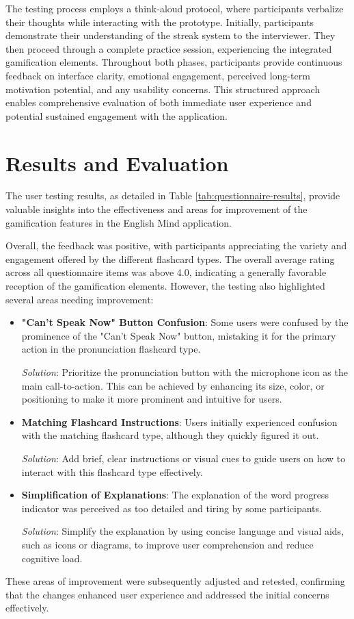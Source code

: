 The testing process employs a think-aloud protocol, where participants verbalize their thoughts while interacting with the prototype. Initially, participants demonstrate their understanding of the streak system to the interviewer. They then proceed through a complete practice session, experiencing the integrated gamification elements. Throughout both phases, participants provide continuous feedback on interface clarity, emotional engagement, perceived long-term motivation potential, and any usability concerns. This structured approach enables comprehensive evaluation of both immediate user experience and potential sustained engagement with the application.

\newpage

\section{Results and Evaluation}

The user testing results, as detailed in Table \ref{tab:questionnaire-results}, provide valuable insights into the effectiveness and areas for improvement of the gamification features in the English Mind application.

Overall, the feedback was positive, with participants appreciating the variety and engagement offered by the different flashcard types. The overall average rating across all questionnaire items was above 4.0, indicating a generally favorable reception of the gamification elements. However, the testing also highlighted several areas needing improvement:

\begin{itemize}
    \item \textbf{"Can't Speak Now" Button Confusion}: Some users were confused by the prominence of the "Can't Speak Now" button, mistaking it for the primary action in the pronunciation flashcard type.
    
    \textit{Solution}: Prioritize the pronunciation button with the microphone icon as the main call-to-action. This can be achieved by enhancing its size, color, or positioning to make it more prominent and intuitive for users.
    
    \item \textbf{Matching Flashcard Instructions}: Users initially experienced confusion with the matching flashcard type, although they quickly figured it out.
    
    \textit{Solution}: Add brief, clear instructions or visual cues to guide users on how to interact with this flashcard type effectively.
    
    \item \textbf{Simplification of Explanations}: The explanation of the word progress indicator was perceived as too detailed and tiring by some participants.
    
    \textit{Solution}: Simplify the explanation by using concise language and visual aids, such as icons or diagrams, to improve user comprehension and reduce cognitive load.
\end{itemize}

These areas of improvement were subsequently adjusted and retested, confirming that the changes enhanced user experience and addressed the initial concerns effectively.

